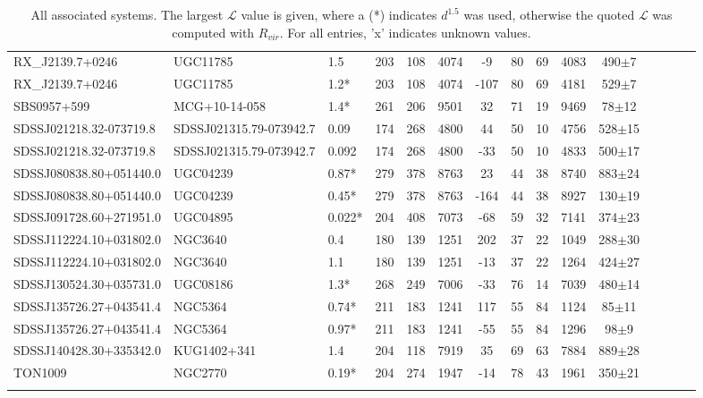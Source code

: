 \documentclass[iop]{emulateapj-rtx4}
\begin{document}
\begin{table}[ht]
\begin{center}
\begin{tabular}{l l l c c c c c c c c c c c c}
RX\_J2139.7+0246  &  UGC11785  &  1.5  &  203  &  108  &  4074  &  -9  &  80  &  69  &  4083  &  490$\pm$7  \\
RX\_J2139.7+0246  &  UGC11785  &  1.2*  &  203  &  108  &  4074  &  -107  &  80  &  69  &  4181  &  529$\pm$7  \\
SBS0957+599  &  MCG+10-14-058  &  1.4*  &  261  &  206  &  9501  &  32  &  71  &  19  &  9469  &  78$\pm$12  \\
SDSSJ021218.32-073719.8  &  SDSSJ021315.79-073942.7  &  0.09  &  174  &  268  &  4800  &  44  &  50  &  10  &  4756  &  528$\pm$15  \\
SDSSJ021218.32-073719.8  &  SDSSJ021315.79-073942.7  &  0.092  &  174  &  268  &  4800  &  -33  &  50  &  10  &  4833  &  500$\pm$17  \\
SDSSJ080838.80+051440.0  &  UGC04239  &  0.87*  &  279  &  378  &  8763  &  23  &  44  &  38  &  8740  &  883$\pm$24  \\
SDSSJ080838.80+051440.0  &  UGC04239  &  0.45*  &  279  &  378  &  8763  &  -164  &  44  &  38  &  8927  &  130$\pm$19  \\
SDSSJ091728.60+271951.0  &  UGC04895  &  0.022*  &  204  &  408  &  7073  &  -68  &  59  &  32  &  7141  &  374$\pm$23  \\
SDSSJ112224.10+031802.0  &  NGC3640  &  0.4  &  180  &  139  &  1251  &  202  &  37  &  22  &  1049  &  288$\pm$30  \\
SDSSJ112224.10+031802.0  &  NGC3640  &  1.1  &  180  &  139  &  1251  &  -13  &  37  &  22  &  1264  &  424$\pm$27  \\
SDSSJ130524.30+035731.0  &  UGC08186  &  1.3*  &  268  &  249  &  7006  &  -33  &  76  &  14  &  7039  &  480$\pm$14  \\
SDSSJ135726.27+043541.4  &  NGC5364  &  0.74*  &  211  &  183  &  1241  &  117  &  55  &  84  &  1124  &  85$\pm$11  \\
SDSSJ135726.27+043541.4  &  NGC5364  &  0.97*  &  211  &  183  &  1241  &  -55  &  55  &  84  &  1296  &  98$\pm$9  \\
SDSSJ140428.30+335342.0  &  KUG1402+341  &  1.4  &  204  &  118  &  7919  &  35  &  69  &  63  &  7884  &  889$\pm$28  \\
TON1009  &  NGC2770  &  0.19*  &  204  &  274  &  1947  &  -14  &  78  &  43  &  1961  &  350$\pm$21  \\



 \\
\hline
\end{tabular}
\end{center}
  \caption{\small{All associated systems. The largest $\mathcal{L}$ value is given, where a (\**) indicates $d^{1.5}$ was used, otherwise the quoted $\mathcal{L}$ was computed with $R_{vir}$. For all entries, 'x' indicates unknown values.}}
  \label{target_table}
\end{table}
\end{document}

